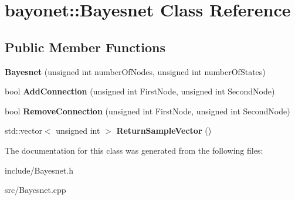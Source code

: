 \hypertarget{classbayonet_1_1_bayesnet}{\section{bayonet\-:\-:Bayesnet Class Reference}
\label{classbayonet_1_1_bayesnet}
}
\subsection*{Public Member Functions}
\begin{DoxyCompactItemize}
\item 
\hypertarget{classbayonet_1_1_bayesnet_a737f36870a5ff30826f205306a3ebaa0}{{\bfseries Bayesnet} (unsigned int number\-Of\-Nodes, unsigned int number\-Of\-States)}\label{classbayonet_1_1_bayesnet_a737f36870a5ff30826f205306a3ebaa0}

\item 
\hypertarget{classbayonet_1_1_bayesnet_aca30de1deda07143604927588e2ff470}{bool {\bfseries Add\-Connection} (unsigned int First\-Node, unsigned int Second\-Node)}\label{classbayonet_1_1_bayesnet_aca30de1deda07143604927588e2ff470}

\item 
\hypertarget{classbayonet_1_1_bayesnet_a73566585e97c08b87160c74796d00bbd}{bool {\bfseries Remove\-Connection} (unsigned int First\-Node, unsigned int Second\-Node)}\label{classbayonet_1_1_bayesnet_a73566585e97c08b87160c74796d00bbd}

\item 
\hypertarget{classbayonet_1_1_bayesnet_abefba0cb0332662154518fbe25a84562}{std\-::vector$<$ unsigned int $>$ {\bfseries Return\-Sample\-Vector} ()}\label{classbayonet_1_1_bayesnet_abefba0cb0332662154518fbe25a84562}

\end{DoxyCompactItemize}


The documentation for this class was generated from the following files\-:\begin{DoxyCompactItemize}
\item 
include/Bayesnet.\-h\item 
src/Bayesnet.\-cpp\end{DoxyCompactItemize}
